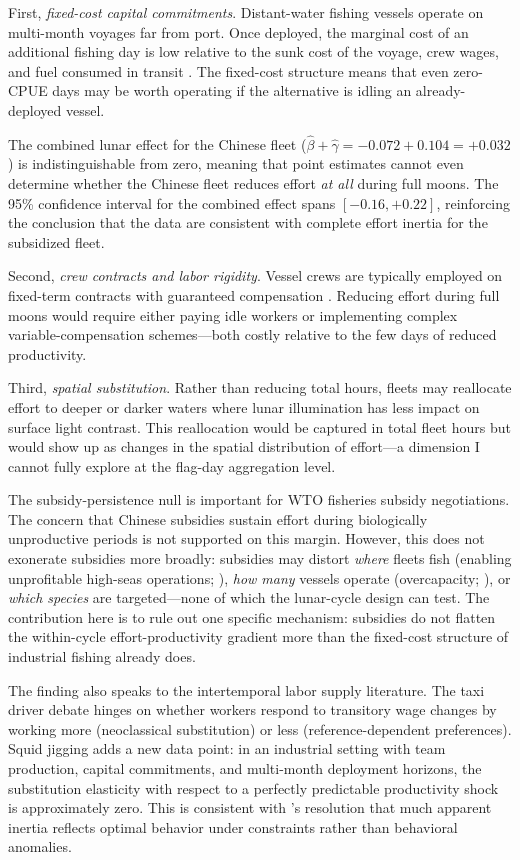 \documentclass[12pt]{article}
\begin{document}
First, \textit{fixed-cost capital commitments}. Distant-water fishing vessels operate on multi-month voyages far from port. Once deployed, the marginal cost of an additional fishing day is low relative to the sunk cost of the voyage, crew wages, and fuel consumed in transit \citep{squires1987, smith2012}. The fixed-cost structure means that even zero-CPUE days may be worth operating if the alternative is idling an already-deployed vessel.

The combined lunar effect for the Chinese fleet ($\hat{\beta} + \hat{\gamma} = -0.072 + 0.104 = +0.032$) is indistinguishable from zero, meaning that point estimates cannot even determine whether the Chinese fleet reduces effort \textit{at all} during full moons. The 95\% confidence interval for the combined effect spans $[-0.16, +0.22]$, reinforcing the conclusion that the data are consistent with complete effort inertia for the subsidized fleet.

Second, \textit{crew contracts and labor rigidity}. Vessel crews are typically employed on fixed-term contracts with guaranteed compensation \citep{homans1997}. Reducing effort during full moons would require either paying idle workers or implementing complex variable-compensation schemes---both costly relative to the few days of reduced productivity.

Third, \textit{spatial substitution}. Rather than reducing total hours, fleets may reallocate effort to deeper or darker waters where lunar illumination has less impact on surface light contrast. This reallocation would be captured in total fleet hours but would show up as changes in the spatial distribution of effort---a dimension I cannot fully explore at the flag-day aggregation level.

The subsidy-persistence null is important for WTO fisheries subsidy negotiations. The concern that Chinese subsidies sustain effort during biologically unproductive periods is not supported on this margin. However, this does not exonerate subsidies more broadly: subsidies may distort \textit{where} fleets fish (enabling unprofitable high-seas operations; \citet{sala2018}), \textit{how many} vessels operate (overcapacity; \citet{costello2016}), or \textit{which species} are targeted---none of which the lunar-cycle design can test. The contribution here is to rule out one specific mechanism: subsidies do not flatten the within-cycle effort-productivity gradient more than the fixed-cost structure of industrial fishing already does.

The finding also speaks to the intertemporal labor supply literature. The taxi driver debate \citep{camerer1997, farber2005, farber2015} hinges on whether workers respond to transitory wage changes by working more (neoclassical substitution) or less (reference-dependent preferences). Squid jigging adds a new data point: in an industrial setting with team production, capital commitments, and multi-month deployment horizons, the substitution elasticity with respect to a perfectly predictable productivity shock is approximately zero. This is consistent with \citet{farber2015}'s resolution that much apparent inertia reflects optimal behavior under constraints rather than behavioral anomalies.
\end{document}
